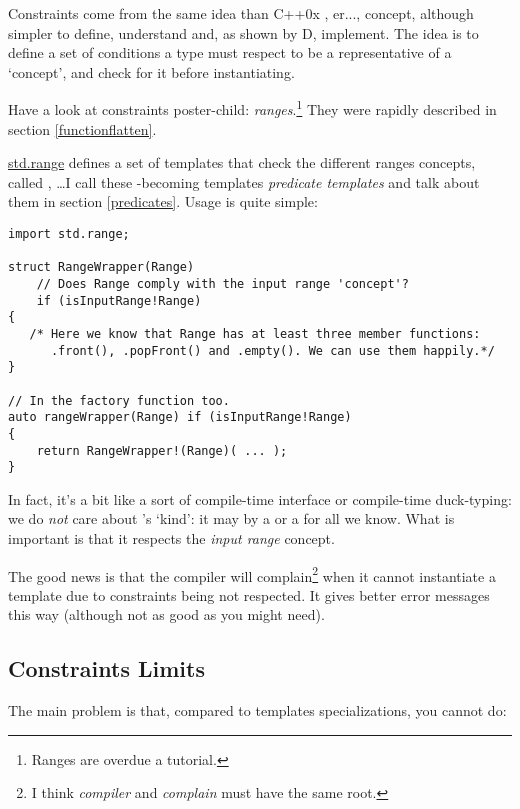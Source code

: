 Constraints come from the same idea than C++0x , er..., concept, although simpler to define, understand and, as shown by D, implement. The idea is to define a set of conditions a type must respect to be a representative of a `concept', and check for it before instantiating.

Have a look at constraints poster-child: \emph{ranges}.\footnote{ Ranges are overdue a tutorial.} They were rapidly described in section \ref{functionflatten}.

\href{www.d-programming-org/phobos/std_range.html}{std.range} defines a set of templates that check the different ranges concepts, called , \ldots I call these -becoming templates \emph{predicate templates} and talk about them in section \ref{predicates}. Usage is quite simple:

\begin{verbatim}
import std.range;

struct RangeWrapper(Range) 
    // Does Range comply with the input range 'concept'?
    if (isInputRange!Range) 
{ 
   /* Here we know that Range has at least three member functions:
      .front(), .popFront() and .empty(). We can use them happily.*/
}

// In the factory function too.
auto rangeWrapper(Range) if (isInputRange!Range) 
{
    return RangeWrapper!(Range)( ... );
}
\end{verbatim}

In fact, it's a bit like a sort of compile-time interface or compile-time duck-typing: we do \emph{not} care about 's `kind': it may by a  or a  for all we know. What is important is that it respects the \emph{input range} concept.

The good news is that the compiler will complain\footnote{ I think \emph{compiler} and \emph{complain} must have the same root.} when it cannot instantiate a template due to constraints being not respected. It gives better error messages this way (although not as good as you might need).

\subsection{Constraints Limits}\label{constraintslimits}

The main problem is that, compared to templates specializations, you cannot do:

